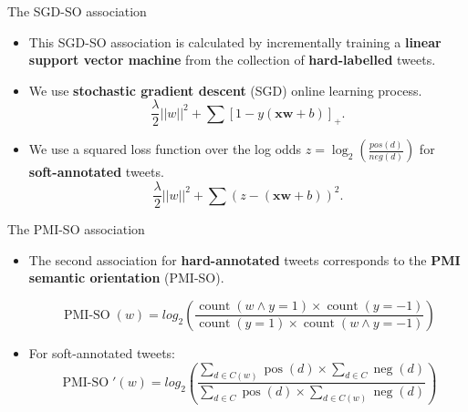 \documentclass[handout]{beamer}
\begin{document}
\begin{frame}{The SGD-SO association }
\begin{scriptsize}
\begin{itemize}
\item  This SGD-SO association is calculated by incrementally training a \textbf{linear support vector machine} from the collection of \textbf{hard-labelled} tweets.
\item We use \textbf{stochastic gradient descent} (SGD) online learning process.
\begin{equation}\label{eq:sgd}
\frac{\lambda}{2}||w||^2+\sum [1- y (\mathbf{xw} +b) ]_{+}.
\end{equation}
\item We use a squared loss function over the log odds $z=\operatorname{log}_2(\frac{pos(d)}{neg(d)})$ for \textbf{soft-annotated} tweets.
\begin{equation}\label{eq:sgdSQ}
\frac{\lambda}{2}||w||^2+\sum (z - (\mathbf{xw} +b))^2.
\end{equation}

\end{itemize}
\end{scriptsize}

\end{frame}


\begin{frame}{The PMI-SO association}
\begin{scriptsize}
\begin{itemize}
\item  The second association for \textbf{hard-annotated} tweets corresponds to the \textbf{PMI semantic orientation} (PMI-SO).

\begin{equation}\label{eq:so}
 \operatorname{PMI-SO}(w) = log_2 \left( \frac{\operatorname{count}(w \wedge y=1) \times \operatorname{count}(y=-1)}{ \operatorname{count}(y=1) \times \operatorname{count}(w\wedge y=-1)}\right)
\end{equation}

\item For soft-annotated tweets:
\begin{equation}\label{eq:so_soft}
 \operatorname{PMI-SO}'(w) = log_2 \left( \frac{ \sum_{d \in C(w)} \operatorname{pos}(d) \times \sum_{d \in C} \operatorname{neg}(d)}{ \sum_{d \in C} \operatorname{pos}(d) \times \sum_{d \in C(w)} \operatorname{neg}(d)}\right)
\end{equation}


\end{itemize}
\end{scriptsize}

\end{frame}
\end{document}
